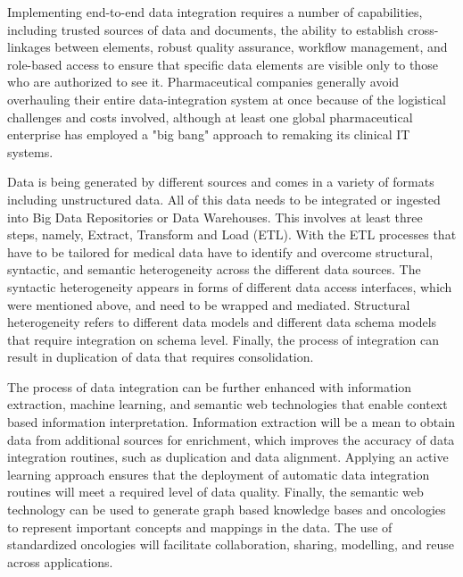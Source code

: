 \documentclass[sigconf]{acmart}
\begin{document}
Implementing end-to-end data integration requires a number of
capabilities, including trusted sources of data and documents, the
ability to establish cross-linkages between elements, robust quality
assurance, workflow management, and role-based access to ensure that
specific data elements are visible only to those who are authorized
to see it. Pharmaceutical companies generally avoid overhauling their
entire data-integration system at once because of the logistical
challenges and costs involved, although at least one global 
pharmaceutical enterprise has employed a "big bang" approach to 
remaking its clinical IT systems. \cite{TR02}

Data is being generated by different sources and comes in a variety
of formats including unstructured data. All of this data needs to 
be integrated or ingested into Big Data Repositories or Data 
Warehouses. This involves at least three steps, namely, Extract, 
Transform and Load (ETL). With the ETL processes that have to be 
tailored for medical data have to identify and overcome structural,
syntactic, and semantic heterogeneity across the different data 
sources. The syntactic heterogeneity appears in forms of different 
data access interfaces, which were mentioned above, and need to be
wrapped and mediated. Structural heterogeneity refers to different
data models and different data schema models that require 
integration on schema level. Finally, the process of integration 
can result in duplication of data that requires consolidation.

The process of data integration can be further enhanced with 
information extraction, machine learning, and semantic web 
technologies that enable context based information interpretation.
Information extraction will be a mean to obtain data from additional
sources for enrichment, which improves the accuracy of data 
integration routines, such as duplication and data alignment. 
Applying an active learning approach ensures that the deployment of
automatic data integration routines will meet a required level of 
data quality. Finally, the semantic web technology can be used to 
generate graph based knowledge bases and oncologies to represent 
important concepts and mappings in the data. The use of standardized 
oncologies will facilitate collaboration, sharing, modelling, and 
reuse across applications. \cite{TR04}
\end{document}
